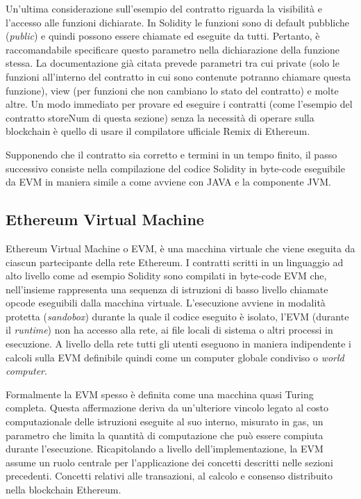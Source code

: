 Un’ultima considerazione sull’esempio del contratto riguarda la visibilità e l’accesso alle funzioni dichiarate. In Solidity le funzioni sono di default pubbliche (\emph{public}) e quindi possono essere chiamate ed eseguite da tutti. Pertanto, è raccomandabile specificare questo parametro nella dichiarazione della funzione stessa. La documentazione già citata prevede parametri tra cui private (solo le funzioni all’interno del contratto in cui sono contenute potranno chiamare questa funzione), view (per funzioni che non cambiano lo stato del contratto) e molte altre. Un modo immediato per provare ed eseguire i contratti (come l'esempio del contratto storeNum di questa sezione) senza la necessità di operare sulla blockchain è quello di usare il compilatore ufficiale Remix di Ethereum.

Supponendo che il contratto sia corretto e termini in un tempo finito, il passo successivo consiste nella compilazione del codice Solidity in byte-code eseguibile da EVM in maniera simile a come avviene con JAVA e la componente JVM.

\subsection{Ethereum Virtual Machine}

Ethereum Virtual Machine o EVM, è una macchina virtuale che viene eseguita da ciascun partecipante della rete Ethereum. I contratti scritti in un linguaggio ad alto livello come ad esempio Solidity sono compilati in byte-code EVM che, nell'insieme rappresenta una sequenza di istruzioni di basso livello chiamate opcode eseguibili dalla macchina virtuale. L’esecuzione avviene in modalità protetta (\emph{sandobox}) durante la quale il codice eseguito è isolato, l’EVM (durante il \emph{runtime}) non ha accesso alla rete, ai file locali di sistema o altri processi in esecuzione. A livello della rete tutti gli utenti eseguono in maniera indipendente i calcoli sulla EVM definibile quindi come un computer globale condiviso o \emph{world computer}.

Formalmente la EVM spesso è definita come una macchina quasi Turing completa. Questa affermazione deriva da un’ulteriore vincolo legato al costo computazionale delle istruzioni eseguite al suo interno, misurato in gas, un parametro che limita la quantità di computazione che può essere compiuta durante l’esecuzione. Ricapitolando a livello dell'implementazione, la EVM assume un ruolo centrale per l'applicazione dei concetti descritti nelle sezioni precedenti. Concetti relativi alle transazioni, al calcolo e consenso distribuito nella blockchain Ethereum.

